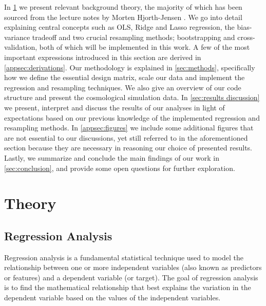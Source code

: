 \documentclass[aps,pra,english,notitlepage,reprint,nofootinbib]{revtex4-1}  %
\begin{document}
In \cref{sec:theory} we present relevant background theory, the majority of which has been sourced from the lecture notes by Morten Hjorth-Jensen \cite{notes}. We go into detail explaining central concepts such as OLS, Ridge and Lasso regression, the bias-variance tradeoff and two crucial resampling methods; bootstrapping and cross-validation, both of which will be implemented in this work. A few of the most important expressions introduced in this section are derived in \cref{appsec:derivations}. Our methodology is explained in \cref{sec:methods}, specifically how we define the essential design matrix, scale our data and implement the regression and resampling techniques. We also give an overview of our code structure and present the cosmological simulation data. In \cref{sec:results discussion} we present, interpret and discuss the results of our analyses in light of expectations based on our previous knowledge of the implemented regression and resampling methods. In \cref{appsec:figures} we include some additional figures that are not essential to our discussions, yet still referred to in the aforementioned section because they are necessary in reasoning our choice of presented results. Lastly, we summarize and conclude the main findings of our work in \cref{sec:conclusion}, and provide some open questions for further exploration. 

\section{Theory}\label{sec:theory}
\subsection{Regression Analysis}
Regression analysis is a fundamental statistical technique used to model the relationship between one or more independent variables (also known as predictors or features) and a dependent variable (or target). The goal of regression analysis is to find the mathematical relationship that best explains the variation in the dependent variable based on the values of the independent variables.
\end{document}
